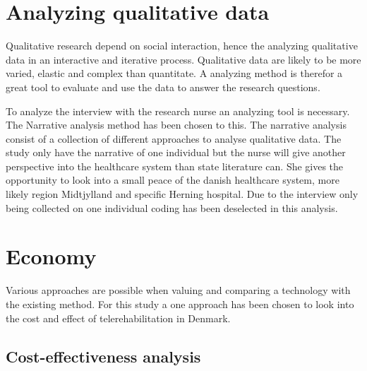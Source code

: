 
\section{Analyzing qualitative data}


Qualitative research depend on social interaction, hence the analyzing qualitative data in an interactive and iterative process. Qualitative data are likely to be more varied, elastic and complex than quantitate. A analyzing method is therefor a great tool to evaluate and use the data to answer the research questions. 

To analyze the interview with the research nurse an analyzing tool is necessary. The Narrative analysis method has been chosen to this. The narrative analysis consist of a collection of different approaches to analyse qualitative data. 
 The study only have the narrative of one individual but the nurse will give another perspective into the healthcare system than state literature can. She gives the opportunity to look into a small peace of the danish healthcare system, more likely region Midtjylland and specific Herning hospital. Due to the interview only being collected on one individual coding has been deselected in this analysis.  



\section{Economy}


Various approaches are possible when valuing and comparing a technology with the existing method. For this study a one approach has been chosen to look into the cost and effect of telerehabilitation in Denmark.

\subsection{Cost-effectiveness analysis}



